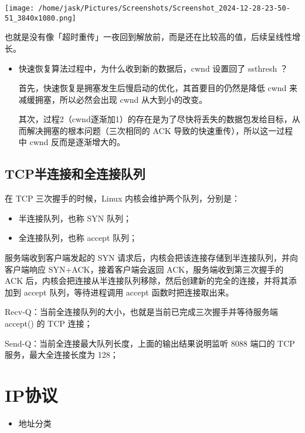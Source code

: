 \documentclass[11pt]{article}
\begin{document}
\begin{enumerate}
\begin{center}
\texttt{[image: /home/jask/Pictures/Screenshots/Screenshot\_2024-12-28-23-50-51\_3840x1080.png]}
\end{center}
也就是没有像「超时重传」一夜回到解放前，而是还在比较高的值，后续呈线性增长。

\begin{itemize}
\item 快速恢复算法过程中，为什么收到新的数据后，cwnd 设置回了 ssthresh ？

首先，快速恢复是拥塞发生后慢启动的优化，其首要目的仍然是降低 cwnd 来减缓拥塞，所以必然会出现 cwnd 从大到小的改变。

其次，过程2（cwnd逐渐加1）的存在是为了尽快将丢失的数据包发给目标，从而解决拥塞的根本问题（三次相同的 ACK 导致的快速重传），所以这一过程中 cwnd 反而是逐渐增大的。
\end{itemize}
\end{enumerate}
\subsection{TCP半连接和全连接队列}
\label{sec:orgec083a8}

在 TCP 三次握手的时候，Linux 内核会维护两个队列，分别是：

\begin{itemize}
\item 半连接队列，也称 SYN 队列；
\item 全连接队列，也称 accept 队列；
\end{itemize}

服务端收到客户端发起的 SYN 请求后，内核会把该连接存储到半连接队列，并向客户端响应 SYN+ACK，接着客户端会返回 ACK，服务端收到第三次握手的 ACK 后，内核会把连接从半连接队列移除，然后创建新的完全的连接，并将其添加到 accept 队列，等待进程调用 accept 函数时把连接取出来。

Recv-Q：当前全连接队列的大小，也就是当前已完成三次握手并等待服务端 accept() 的 TCP 连接；

Send-Q：当前全连接最大队列长度，上面的输出结果说明监听 8088 端口的 TCP 服务，最大全连接长度为 128；
\section{IP协议}
\label{sec:orgdeae928}

\begin{itemize}
\item 地址分类
\end{itemize}
\end{document}
